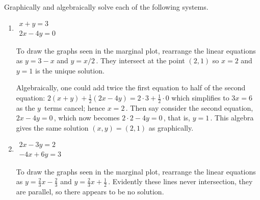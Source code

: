 \begin{example} \label{eg:2eqs2vars}
Graphically and algebraically solve each of the following systems.
\begin{enumerate}
\item \label{eg:2eqs2vars:a}
\(\begin{array}{l} x+y=3\\2x-4y=0 \end{array}\)
\begin{solution} 
To draw the graphs seen in the marginal plot, rearrange  the linear equations as \(y=3-x\) and \(y=x/2\)\,.  
%
They intersect at the point \((2,1)\) so \(x=2\) and \(y=1\) is the unique solution.

Algebraically, one could add twice the first equation to half of the second equation: \(2(x+y)+\frac12(2x-4y)=2\cdot3+\frac12\cdot0\) which simplifies to \(3x=6\) as the \(y\)~terms cancel; hence \(x=2\)\,.  
Then say consider the second equation, \(2x-4y=0\)\,, which now becomes \(2\cdot2-4y=0\)\,, that is, \(y=1\)\,.  
This algebra gives the same solution \((x,y)=(2,1)\) as graphically.
\end{solution}


\item \(\begin{array}{l} 2x-3y=2\\-4x+6y=3 \end{array}\)
\begin{solution} 
To draw the graphs seen in the marginal plot, rearrange  the linear equations as \(y=\frac23x-\frac23\) and \(y=\frac23x+\frac12\)\,.  
%
Evidently these lines never intersection, they are parallel, so there appears to be no solution.


\end{solution}
\end{enumerate}
\end{example}
